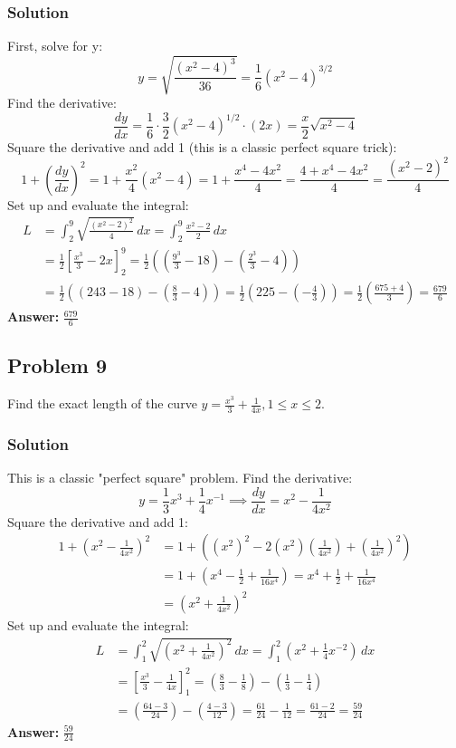 \documentclass{article}
\begin{document}
\subsubsection*{Solution}
First, solve for y:
\[ y = \sqrt{\frac{(x^2-4)^3}{36}} = \frac{1}{6}(x^2-4)^{3/2} \]
Find the derivative:
\[ \frac{dy}{dx} = \frac{1}{6} \cdot \frac{3}{2}(x^2-4)^{1/2} \cdot (2x) = \frac{x}{2}\sqrt{x^2-4} \]
Square the derivative and add 1 (this is a classic perfect square trick):
\[ 1 + \left(\frac{dy}{dx}\right)^2 = 1 + \frac{x^2}{4}(x^2-4) = 1 + \frac{x^4-4x^2}{4} = \frac{4+x^4-4x^2}{4} = \frac{(x^2-2)^2}{4} \]
Set up and evaluate the integral:
\begin{align*}
    L &= \int_{2}^{9} \sqrt{\frac{(x^2-2)^2}{4}} \,dx = \int_{2}^{9} \frac{x^2-2}{2} \,dx \\
    &= \frac{1}{2} \left[ \frac{x^3}{3} - 2x \right]_{2}^{9} = \frac{1}{2} \left( \left(\frac{9^3}{3}-18\right) - \left(\frac{2^3}{3}-4\right) \right) \\
    &= \frac{1}{2} \left( (243-18) - (\frac{8}{3}-4) \right) = \frac{1}{2} \left( 225 - (-\frac{4}{3}) \right) = \frac{1}{2}\left( \frac{675+4}{3} \right) = \frac{679}{6}
\end{align*}
\textbf{Answer:} $ \frac{679}{6} $

\subsection{Problem 9}
Find the exact length of the curve $ y = \frac{x^3}{3} + \frac{1}{4x}, 1 \le x \le 2 $.
\subsubsection*{Solution}
This is a classic "perfect square" problem.
Find the derivative:
\[ y = \frac{1}{3}x^3 + \frac{1}{4}x^{-1} \implies \frac{dy}{dx} = x^2 - \frac{1}{4x^2} \]
Square the derivative and add 1:
\begin{align*}
    1 + \left(x^2 - \frac{1}{4x^2}\right)^2 &= 1 + \left((x^2)^2 - 2(x^2)\left(\frac{1}{4x^2}\right) + \left(\frac{1}{4x^2}\right)^2\right) \\
    &= 1 + \left(x^4 - \frac{1}{2} + \frac{1}{16x^4}\right) = x^4 + \frac{1}{2} + \frac{1}{16x^4} \\
    &= \left(x^2 + \frac{1}{4x^2}\right)^2
\end{align*}
Set up and evaluate the integral:
\begin{align*}
    L &= \int_{1}^{2} \sqrt{\left(x^2 + \frac{1}{4x^2}\right)^2} \,dx = \int_{1}^{2} \left(x^2 + \frac{1}{4}x^{-2}\right) \,dx \\
    &= \left[ \frac{x^3}{3} - \frac{1}{4x} \right]_{1}^{2} = \left(\frac{8}{3} - \frac{1}{8}\right) - \left(\frac{1}{3} - \frac{1}{4}\right) \\
    &= \left(\frac{64-3}{24}\right) - \left(\frac{4-3}{12}\right) = \frac{61}{24} - \frac{1}{12} = \frac{61-2}{24} = \frac{59}{24}
\end{align*}
\textbf{Answer:} $ \frac{59}{24} $
\end{document}

